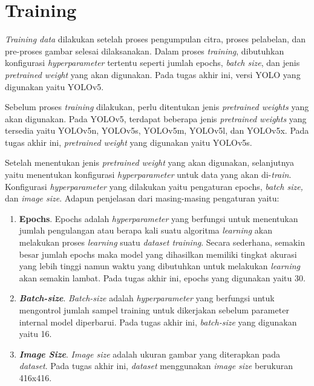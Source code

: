 \section{Training}
\label{sec:trainingdata}

\textit{Training data} dilakukan setelah proses pengumpulan citra, proses pelabelan, dan pre-proses gambar selesai dilaksanakan. Dalam proses \textit{training}, dibutuhkan konfigurasi \textit{hyperparameter} tertentu seperti jumlah epochs, \textit{batch size}, dan jenis \textit{pretrained weight} yang akan digunakan. Pada tugas akhir ini, versi YOLO yang digunakan yaitu YOLOv5. \par

Sebelum proses \textit{training} dilakukan, perlu ditentukan jenis \textit{pretrained weights} yang akan digunakan. Pada YOLOv5, terdapat beberapa jenis \textit{pretrained weights} yang tersedia yaitu YOLOv5n, YOLOv5s, YOLOv5m, YOLOv5l, dan YOLOv5x. Pada tugas akhir ini, \textit{pretrained weight} yang digunakan yaitu YOLOv5s. \par

Setelah menentukan jenis \textit{pretrained weight} yang akan digunakan, selanjutnya yaitu menentukan konfigurasi \textit{hyperparameter} untuk data yang akan di-\textit{train}. Konfigurasi \textit{hyperparameter} yang dilakukan yaitu pengaturan epochs, \textit{batch size,} dan \textit{image size}. Adapun penjelasan dari masing-masing pengaturan yaitu: \par
\begin{enumerate}[nolistsep]
    \item \textbf{Epochs}. Epochs adalah \textit{hyperparameter} yang berfungsi untuk menentukan jumlah pengulangan atau berapa kali suatu algoritma \textit{learning} akan melakukan proses \textit{learning} suatu \textit{dataset training}. Secara sederhana, semakin besar jumlah epochs maka model yang dihasilkan memiliki tingkat akurasi yang lebih tinggi namun waktu yang dibutuhkan untuk melakukan \textit{learning} akan semakin lambat. Pada tugas akhir ini, epochs yang digunakan yaitu 30.
    \item \textit{\textbf{Batch-size}}. \textit{Batch-size} adalah \textit{hyperparameter} yang berfungsi untuk mengontrol jumlah sampel training untuk dikerjakan sebelum parameter internal model diperbarui. Pada tugas akhir ini, \textit{batch-size} yang digunakan yaitu 16.
    \item \textit{\textbf{Image Size}}. \textit{Image size} adalah ukuran gambar yang diterapkan pada \textit{dataset}. Pada tugas akhir ini, \textit{dataset} menggunakan \textit{image size} berukuran 416x416.
\end{enumerate}

